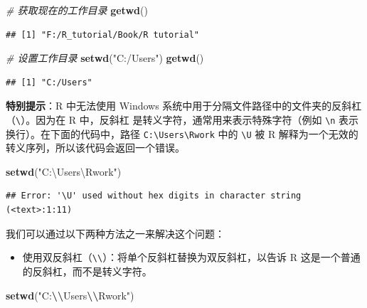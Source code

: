 \documentclass[
]{book}
\newenvironment{Shaded}{\begin{snugshade}}{\end{snugshade}}
\newcommand{\CommentTok}[1]{\textcolor[rgb]{0.56,0.35,0.01}{\textit{#1}}}
\newcommand{\FunctionTok}[1]{\textcolor[rgb]{0.13,0.29,0.53}{\textbf{#1}}}
\newcommand{\NormalTok}[1]{#1}
\newcommand{\SpecialCharTok}[1]{\textcolor[rgb]{0.81,0.36,0.00}{\textbf{#1}}}
\newcommand{\StringTok}[1]{\textcolor[rgb]{0.31,0.60,0.02}{#1}}
\providecommand{\tightlist}{%
  \setlength{\itemsep}{0pt}\setlength{\parskip}{0pt}}
\begin{document}
\begin{Shaded}
\begin{Highlighting}[]
\CommentTok{\# 获取现在的工作目录}
\FunctionTok{getwd}\NormalTok{()}
\end{Highlighting}
\end{Shaded}

\begin{verbatim}
## [1] "F:/R_tutorial/Book/R tutorial"
\end{verbatim}

\begin{Shaded}
\begin{Highlighting}[]
\CommentTok{\# 设置工作目录}
\FunctionTok{setwd}\NormalTok{(}\StringTok{"C:/Users"}\NormalTok{)}
\FunctionTok{getwd}\NormalTok{()}
\end{Highlighting}
\end{Shaded}

\begin{verbatim}
## [1] "C:/Users"
\end{verbatim}

\textbf{特别提示}：R 中无法使用 Windows 系统中用于分隔文件路径中的文件夹的反斜杠（\texttt{\textbackslash{}}）。因为在 R 中，反斜杠 是转义字符，通常用来表示特殊字符（例如 \texttt{\textbackslash{}n} 表示换行）。在下面的代码中，路径 \texttt{C:\textbackslash{}Users\textbackslash{}Rwork} 中的 \texttt{\textbackslash{}U} 被 R 解释为一个无效的转义序列，所以该代码会返回一个错误。

\begin{Shaded}
\begin{Highlighting}[]
\FunctionTok{setwd}\NormalTok{(}\StringTok{"C:\textbackslash{}Users\textbackslash{}Rwork"}\NormalTok{)}
\end{Highlighting}
\end{Shaded}

\begin{verbatim}
## Error: '\U' used without hex digits in character string (<text>:1:11)
\end{verbatim}

我们可以通过以下两种方法之一来解决这个问题：

\begin{itemize}
\tightlist
\item
  使用双反斜杠（\texttt{\textbackslash{}\textbackslash{}}）：将单个反斜杠替换为双反斜杠，以告诉 R 这是一个普通的反斜杠，而不是转义字符。
\end{itemize}

\begin{Shaded}
\begin{Highlighting}[]
\FunctionTok{setwd}\NormalTok{(}\StringTok{"C:}\SpecialCharTok{\textbackslash{}\textbackslash{}}\StringTok{Users}\SpecialCharTok{\textbackslash{}\textbackslash{}}\StringTok{Rwork"}\NormalTok{)}
\end{Highlighting}
\end{Shaded}
\end{document}
